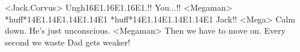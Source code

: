 <Jack.Corvus> Ungh{16}{E1}.{16}{E1}.{16}{E1}.!! You...!! 
<Megaman> *huff*{14}{E1}.{14}{E1}.{14}{E1}.{14}{E1} *huff*{14}{E1}.{14}{E1}.{14}{E1}.{14}{E1} 
Jack!! 
<Mega> Calm down. He's just unconscious. 
<Megaman> Then we have to move on. 
Every second we waste Dad gets weaker! 
